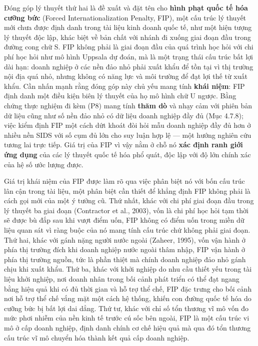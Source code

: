 \documentclass[
  a4paper,
  13pt]{extreport}
\begin{document}
Đóng góp lý thuyết thứ hai là đề xuất và đặt tên cho \textbf{hình phạt
quốc tế hóa cưỡng bức} (Forced Internationalization Penalty, FIP), một
cấu trúc lý thuyết mới chưa được định danh trong tài liệu kinh doanh
quốc tế, như một hiện tượng lý thuyết độc lập, khác biệt về bản chất với
nhánh đi xuống giai đoạn đầu trong đường cong chữ S. FIP không phải là
giai đoạn đầu của quá trình học hỏi với chi phí học hỏi như mô hình
Uppsala dự đoán, mà là một trạng thái cấu trúc bất lợi dài hạn: doanh
nghiệp ở các nền đảo nhỏ phải xuất khẩu để tồn tại vì thị trường nội địa
quá nhỏ, nhưng không có năng lực và môi trường để đạt lợi thế từ xuất
khẩu. Cần nhấn mạnh rằng đóng góp này chủ yếu mang tính \textbf{khái
niệm}: FIP định danh một điều kiện biên lý thuyết của họ mô hình chữ U
ngược. Bằng chứng thực nghiệm đi kèm (P8) mang tính \textbf{thăm dò} và
nhạy cảm với phiên bản dữ liệu cũng như số nền đảo nhỏ có dữ liệu doanh
nghiệp đầy đủ (Mục 4.7.8); việc kiểm định FIP một cách dứt khoát đòi hỏi
mẫu doanh nghiệp đầy đủ hơn ở nhiều nền SIDS với số cụm đủ lớn cho suy
luận hợp lệ --- một hướng nghiên cứu tương lai trực tiếp. Giá trị của
FIP vì vậy nằm ở chỗ nó \textbf{xác định ranh giới ứng dụng} của các lý
thuyết quốc tế hóa phổ quát, độc lập với độ lớn chính xác của hệ số ước
lượng được.

Giá trị khái niệm của FIP được làm rõ qua việc phân biệt nó với bốn cấu
trúc lân cận trong tài liệu, một phân biệt cần thiết để khẳng định FIP
không phải là cách gọi mới của một ý tưởng cũ. Thứ nhất, khác với chi
phí giai đoạn đầu trong lý thuyết ba giai đoạn (Contractor et al.,
2003), vốn là chi phí học hỏi tạm thời sẽ được bù đắp sau khi vượt điểm
uốn, FIP không có điểm uốn trong miền dữ liệu quan sát vì ràng buộc của
nó mang tính cấu trúc chứ không phải giai đoạn. Thứ hai, khác với gánh
nặng người nước ngoài (Zaheer, 1995), vốn vận hành ở phía thị trường
đích khi doanh nghiệp nước ngoài thâm nhập, FIP vận hành ở phía thị
trường nguồn, tức là phần thiệt mà chính doanh nghiệp đảo nhỏ gánh chịu
khi xuất khẩu. Thứ ba, khác với khởi nghiệp do nhu cầu thiết yếu trong
tài liệu khởi nghiệp, nơi doanh nhân trong bối cảnh phát triển có thể
đạt ngang bằng hiệu quả khi có đủ thời gian và hỗ trợ thể chế, FIP đặc
trưng cho bối cảnh nơi hỗ trợ thể chế vắng mặt một cách hệ thống, khiến
con đường quốc tế hóa do cưỡng bức bị bất lợi dai dẳng. Thứ tư, khác với
chỉ số tổn thương vĩ mô vốn đo mức phơi nhiễm của nền kinh tế trước cú
sốc bên ngoài, FIP là một cấu trúc vi mô ở cấp doanh nghiệp, định danh
chính cơ chế hiệu quả mà qua đó tổn thương cấu trúc vĩ mô chuyển hóa
thành kết quả cấp doanh nghiệp.
\end{document}
